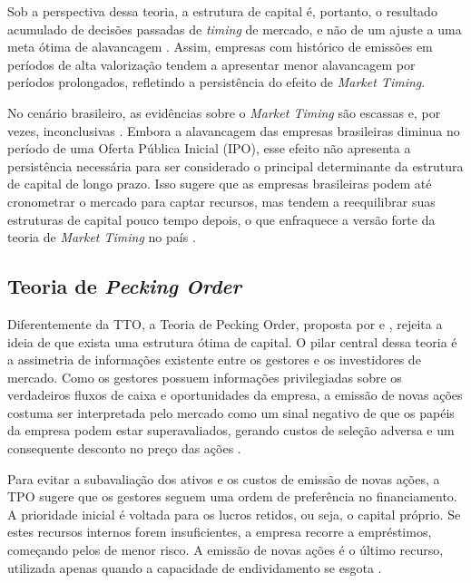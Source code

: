 \documentclass[a4paper,12pt]{article}
\begin{document}
Sob a perspectiva dessa teoria, a estrutura de capital é, portanto, o resultado acumulado de decisões passadas de \textit{timing} de mercado, e não de um ajuste a uma meta ótima de alavancagem \cite{baker2002}. Assim, empresas com histórico de emissões em períodos de alta valorização tendem a apresentar menor alavancagem por períodos prolongados, refletindo a persistência do efeito de \textit{Market Timing}.
 
No cenário brasileiro, as evidências sobre o \textit{Market Timing} são escassas e, por vezes, inconclusivas \cite{januario2022}. Embora a alavancagem das empresas brasileiras diminua no período de uma Oferta Pública Inicial (IPO), esse efeito não apresenta a persistência necessária para ser considerado o principal determinante da estrutura de capital de longo prazo. Isso sugere que as empresas brasileiras podem até cronometrar o mercado para captar recursos, mas tendem a reequilibrar suas estruturas de capital pouco tempo depois, o que enfraquece a versão forte da teoria de \textit{Market Timing} no país \cite{januario2022}.

\subsection{Teoria de \textit{Pecking Order}}

Diferentemente da TTO, a Teoria de Pecking Order, proposta por  e , rejeita a ideia de que exista uma estrutura ótima de capital. O pilar central dessa teoria é a assimetria de informações existente entre os gestores e os investidores de mercado. Como os gestores possuem informações privilegiadas sobre os verdadeiros fluxos de caixa e oportunidades da empresa, a emissão de novas ações costuma ser interpretada pelo mercado como um sinal negativo de que os papéis da empresa podem estar superavaliados, gerando custos de seleção adversa e um consequente desconto no preço das ações \cite{Singh2025,Yildirim2021}.

Para evitar a subavaliação dos ativos e os custos de emissão de novas ações, a TPO sugere que os gestores seguem uma ordem de preferência no financiamento. A prioridade inicial é voltada para os lucros retidos, ou seja, o capital próprio. Se estes recursos internos forem insuficientes, a empresa recorre a empréstimos, começando pelos de menor risco. A emissão de novas ações é o último recurso, utilizada apenas quando a capacidade de endividamento se esgota \cite{Souza2024,Yildirim2021,Singh2025}.
\end{document}
